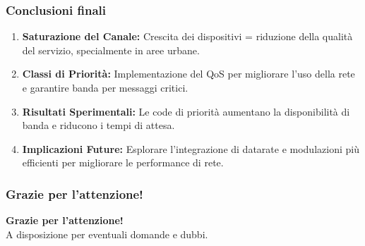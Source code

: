 \documentclass{beamer}
\begin{document}
\begin{frame}
    \frametitle{Conclusioni finali}

    \begin{enumerate}
        \vspace{5pt}
        \item \textbf{Saturazione del Canale:} Crescita dei dispositivi = riduzione della qualità del servizio, specialmente in aree urbane.
        \vspace{5pt}
        \item \textbf{Classi di Priorità:} Implementazione del QoS per migliorare l'uso della rete e garantire banda per messaggi critici.
        \vspace{5pt}
        \item \textbf{Risultati Sperimentali:} Le code di priorità aumentano la disponibilità di banda e riducono i tempi di attesa.
        \vspace{5pt}
        \item \textbf{Implicazioni Future:} Esplorare l'integrazione di datarate e modulazioni più efficienti per migliorare le performance di rete.
        \vspace{5pt}
    \end{enumerate}

\end{frame}

\begin{frame}
    \frametitle{Grazie per l'attenzione!}

    \begin{center}
        \textbf{Grazie per l'attenzione!} \\[1em]
        A disposizione per eventuali domande e dubbi.
    \end{center}

\end{frame}
\end{document}
